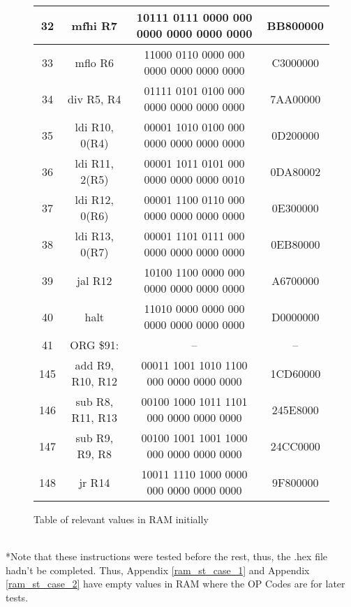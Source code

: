 \documentclass{article}
\begin{document}
\begin{figure}[h!]
\begin{center}
\begin{tabular}{|c|c|c|c|}
                \hline
                32 & mfhi R7 & 10111 0111 0000 000 0000 0000 0000 0000 & BB800000 \\
                \hline
                33 & mflo R6 & 11000 0110 0000 000 0000 0000 0000 0000 & C3000000 \\
                \hline
                34 & div R5, R4 & 01111 0101 0100 000 0000 0000 0000 0000 & 7AA00000 \\
                \hline
                35 & ldi R10, 0(R4) & 00001 1010 0100 000 0000 0000 0000 0000 & 0D200000 \\
                \hline
                36 & ldi R11, 2(R5) & 00001 1011 0101 000 0000 0000 0000 0010 & 0DA80002 \\
                \hline
                37 & ldi R12, 0(R6) & 00001 1100 0110 000 0000 0000 0000 0000 & 0E300000 \\
                \hline
                38 & ldi R13, 0(R7) & 00001 1101 0111 000 0000 0000 0000 0000 & 0EB80000 \\
                \hline
                39 & jal R12 & 10100 1100 0000 000 0000 0000 0000 0000 &A6700000 \\
                \hline
                40 & halt & 11010 0000 0000 000 0000 0000 0000 0000 &D0000000 \\
                \hline
                41 & ORG \$91: & – & –\\
                \hline
                145 &add R9, R10, R12 & 00011 1001 1010 1100 000 0000 0000 0000 & 1CD60000\\
                \hline
                146 &sub R8, R11, R13 & 00100 1000 1011 1101 000 0000 0000 0000 & 245E8000\\
                \hline
                147 & sub R9, R9, R8 & 00100 1001 1001 1000 000 0000 0000 0000 & 24CC0000\\
                \hline
                148 & jr R14 & 10011 1110 1000 0000 000 0000 0000 0000 & 9F800000\\
                \hline
            \end{tabular}
            \caption{Table of relevant values in RAM initially}
        \end{center}
    \end{figure}
    \\
    \small{*Note that these instructions were tested before the rest, thus, the .hex file hadn't be completed. Thus, Appendix \ref{ram_st_case_1} and Appendix \ref{ram_st_case_2} have empty values in RAM where the OP Codes are for later tests.}
\end{document}
